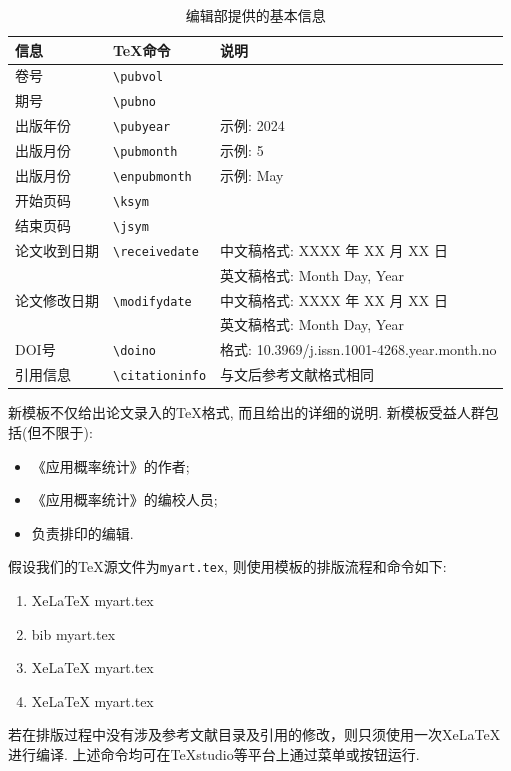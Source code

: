 \documentclass[Chinese]{APSart}
\begin{document}
\begin{enumerate}[leftmargin=7.8mm,itemsep=-0.1ex,label=(\arabic*)]
\begin{table}[htbp]
\centering{}
\caption{编辑部提供的基本信息\label{tab:jeo-metainfor}}
\begin{tabular}{lll}
\toprule
信息       &  \TeX 命令      & 说明\\
\midrule
 卷号           & \verb/\pubvol/      & \\ 
 期号		   	  & \verb/\pubno/       & \\
 出版年份     	 & \verb/\pubyear/     & 示例: 2024\\
 出版月份        & \verb/\pubmonth/    & 示例: 5 \\
 出版月份        & \verb/\enpubmonth/  & 示例: May\\
 开始页码        & \verb/\ksym/        & \\
 结束页码        & \verb/\jsym/        & \\   
 论文收到日期		& \verb/\receivedate/ &  中文稿格式: XXXX 年 XX 月 XX 日\\
                &                     &  英文稿格式: Month Day, Year\\
 论文修改日期      & \verb/\modifydate/  & 中文稿格式: XXXX 年 XX 月 XX 日\\
                &                     &  英文稿格式: Month Day, Year\\
 DOI号           & \verb/\doino/        & 格式: 10.3969/j.issn.1001-4268.year.month.no\\
 引用信息         & \verb/\citationinfo/ & 与文后参考文献格式相同\\
\bottomrule
\end{tabular}
\end{table}
   
\end{enumerate}

\begin{remark}
新模板不仅给出论文录入的\TeX{}格式, 而且给出的详细的说明. 新模板受益人群包括(但不限于):
\begin{itemize}[leftmargin=7.8mm,itemsep=-0.1ex]
\item 《应用概率统计》的作者;
\item 《应用概率统计》的编校人员;
\item 负责排印的编辑. 
\end{itemize}	
\end{remark}
\begin{remark}		
假设我们的\TeX{}源文件为\texttt{myart.tex}, 则使用模板的排版流程和命令如下:
\begin{enumerate}[leftmargin=7.8mm,itemsep=-0.1ex,label=\arabic*)]
	\item Xe\LaTeX{} myart.tex
	\item bib myart.tex
	\item Xe\LaTeX{} myart.tex
	\item Xe\LaTeX{} myart.tex
\end{enumerate}
若在排版过程中没有涉及参考文献目录及引用的修改，则只须使用一次Xe\LaTeX{}进行编译. 上述命令均可在TeXstudio等平台上通过菜单或按钮运行. 
\end{remark}
\end{document}
